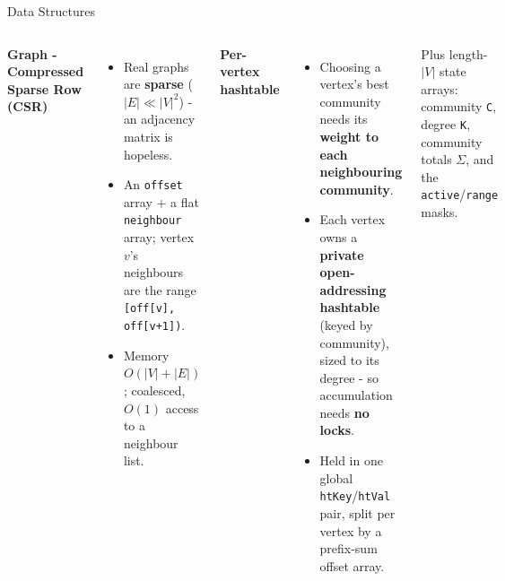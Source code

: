 \documentclass[aspectratio=169]{beamer}
\begin{document}
\begin{frame}{Data Structures}
    \begin{columns}[T]
        \textbf{Graph - Compressed Sparse Row (CSR)}
        \begin{itemize}\small
            \item Real graphs are \textbf{sparse} ($|E|\ll|V|^2$) - an adjacency matrix is
            hopeless.
            \item An \texttt{offset} array + a flat \texttt{neighbour} array; vertex $v$'s
            neighbours are the range \texttt{[off[v], off[v{+}1])}.
            \item Memory $O(|V|+|E|)$; coalesced, $O(1)$ access to a neighbour list.
        \end{itemize}
        \vspace{0.2em}
        \centering
        \textbf{Per-vertex hashtable}
        \begin{itemize}\small
            \item Choosing a vertex's best community needs its \textbf{weight to each
            neighbouring community}.
            \item Each vertex owns a \textbf{private open-addressing hashtable} (keyed by
            community), sized to its degree - so accumulation needs \textbf{no locks}.
            \item Held in one global \texttt{htKey}/\texttt{htVal} pair, split per vertex by a
            prefix-sum offset array.
        \end{itemize}
        \vspace{0.3em}
        Plus length-$|V|$ state arrays: community \texttt{C}, degree \texttt{K}, community
        totals $\Sigma$, and the \texttt{active}/\texttt{range} masks.
    \end{columns}
\end{frame}
\end{document}
